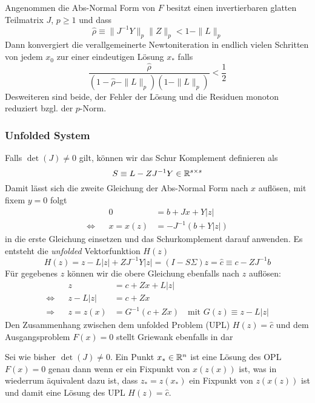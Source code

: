 \begin{theorem}
 Angenommen die Abs-Normal Form von $F$ besitzt einen invertierbaren glatten Teilmatrix $J$, $p\geq 1$ und dass
 \[
  \hat \rho \equiv \| J^{-1}Y \|_p \|Z\|_p < 1 - \|L\|_p
 \]
 Dann konvergiert die verallgemeinerte Newtoniteration in endlich vielen Schritten von jedem $x_0$ zur einer eindeutigen Lösung $x_*$ falls
 \[
  \frac{\hat \rho}{(1-\hat \rho - \|L\|_p)(1-\|L\|_p)} < \frac{1}{2}
 \]
Desweiteren sind beide, der Fehler der Lösung und die Residuen monoton reduziert bzgl. der $p$-Norm.
\end{theorem}

\subsubsection{Unfolded System}

Falls $\det(J) \neq 0$ gilt, können wir das Schur Komplement definieren als 
 \[
  S \equiv L -ZJ^{-1}Y \in \mathbb{R}^{s\times s}
 \]
Damit lässt sich die zweite Gleichung der Abs-Normal Form nach $x$ auflösen, mit fixem $y=0$ folgt
\[
 \begin{aligned}
		 && 0 &=  b+Jx + Y|z|   \\
 \Leftrightarrow && x = x(z) &=-J^{-1}(b+Y|z|)
 \end{aligned}
\]
in die erste Gleichung einsetzen und das Schurkomplement darauf anwenden. Es entsteht die \textit{unfolded} Vektorfunktion $H(z)$
\[
 H(z) = z - L|z| + ZJ^{-1}Y|z| = (I-S\Sigma)z = \hat c \equiv c-ZJ^{-1}b
 \]
Für gegebenes $z$ können wir die obere Gleichung ebenfalls nach $z$ auflösen:
\[
\begin{aligned}
		 && z &= c+Zx + L|z|\\
 \Leftrightarrow && z- L |z| &= c+Zx \\
 \Rightarrow && z = z(x) &= G^{-1}(c+Zx)\quad \text{mit }G(z)\equiv z-L|z|
\end{aligned} 
\]
Den Zusammenhang zwischen dem unfolded Problem (UPL) $H(z) = \hat c$ und dem Ausgangsproblem $F(x) = 0$ stellt Griewank ebenfalls in \cite[Lemma 6.5.]{plan} dar

\begin{theorem}
 Sei wie bisher $\det(J)\neq 0$. Ein Punkt $x_*\in \mathbb{R}^n$ ist eine Lösung des OPL $F(x)=0$ genau dann wenn er ein Fixpunkt von $x(z(x))$ ist, was in wiederrum äquivalent dazu ist, dass $z_*=z(x_*)$ ein Fixpunkt von $z(x(z))$ ist und damit eine Lösung des UPL $H(z)=\hat c$.
\end{theorem}

